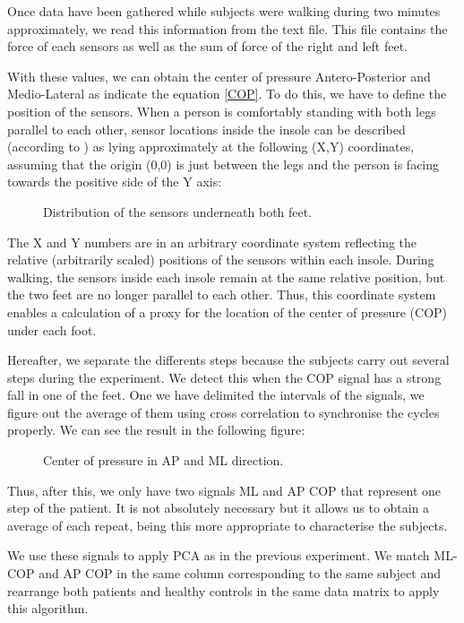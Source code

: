 Once data have been gathered while subjects were walking during two minutes approximately, we read this information from the text file. This file contains the force of each sensors as well as the sum of force of the right and left feet.

With these values, we can obtain the center of pressure Antero-Posterior and Medio-Lateral  as indicate the equation \ref*{COP}. To do this, we have to define the position of the sensors. When a person is comfortably standing with both legs parallel to each other, sensor locations inside the insole can be described (according to \cite{Instr6}) as lying approximately at the following (X,Y) coordinates, assuming that the origin (0,0) is just between the legs and the person is facing towards the positive side of the Y axis:
\begin{figure}[H]
	\centering
	\caption{Distribution of the sensors underneath both feet.}
	\label{fig:DistributionSensors}
\end{figure}

The X and Y numbers are in an arbitrary coordinate system reflecting the relative (arbitrarily scaled) positions of the sensors within each insole. During walking, the sensors inside each insole remain at the same relative position, but the two feet are no longer parallel to each other. Thus, this coordinate system enables a calculation of a proxy for the location of the center of pressure (COP) under each foot.

Hereafter, we separate the differents steps because the subjects carry out several steps during the experiment. We detect this when the COP signal has a strong fall in one of the feet. One we have delimited the intervals of the signals, we figure out the average of them using cross correlation to synchronise the cycles properly. We can see the result in the following figure:
\begin{figure}[H]
	\centering
	\caption{Center of pressure in AP and ML direction.}
	\label{fig:COP}
\end{figure}

Thus, after this, we only have two signals ML and AP COP that represent one step of the patient. It is not absolutely necessary but it allows us to obtain a average of each repeat, being this more appropriate to characterise the subjects.

We use these signals to apply PCA as in the previous experiment. We match ML-COP and AP COP in the same column corresponding to the same subject and rearrange both patients and healthy controls in the same data matrix to apply this algorithm.

